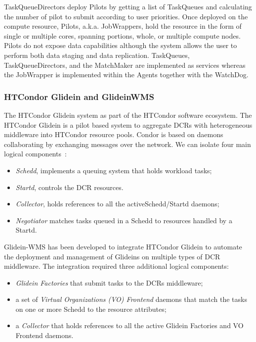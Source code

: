 TaskQueueDirectors deploy Pilots by getting a list of TaskQueues and calculating
the number of pilot to submit according to user priorities. Once deployed on the
compute resource, Pilots, a.k.a. JobWrappers, hold the resource in the form of
single or multiple cores, spanning portions, whole, or multiple compute nodes.
Pilots do not expose data capabilities although the system allows the user to
perform both data staging and data replication. TaskQueues, TaskQueueDirectors,
and the MatchMaker are implemented as services whereas the JobWrapper is
implemented within the Agents together with the WatchDog.


\subsubsection{HTCondor Glidein and GlideinWMS}

The HTCondor Glidein system as part of the HTCondor software ecosystem. The
HTCondor Glidein is a pilot based system to aggregate DCRs with heterogeneous
middleware into HTCondor resource pools. Condor is based on daemons
collaborating by exchanging messages over the network. We can isolate four main
logical components~\cite{Sfiligoi2008}:

\begin{itemize}
    \item \emph{Schedd}, implements a queuing system that holds workload tasks;
    \item \emph{Startd}, controls the DCR resources.
    \item \emph{Collector}, holds references to all the activeSchedd/Startd daemons;
    \item \emph{Negotiator} matches tasks queued in a Schedd to resources handled by a Startd.
\end{itemize}

Glidein-WMS has been developed to integrate HTCondor Glidein to  automate the
deployment and management of Glideins on multiple types of DCR middleware. The
integration required three additional logical components:

\begin{itemize}
    \item \emph{Glidein Factories} that submit tasks to the DCRs middleware;
    \item a set of \emph{Virtual Organizations (VO) Frontend} daemons that
    match the tasks on one or more Schedd to the resource attributes;
    \item a \emph{Collector} that holds references to all the active Glidein
    Factories and VO Frontend daemons.
\end{itemize}

